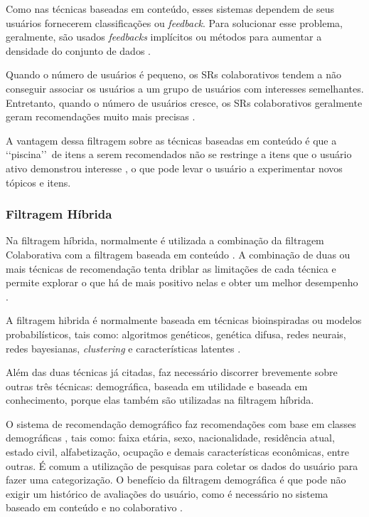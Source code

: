 Como nas técnicas baseadas em conteúdo, esses sistemas dependem de seus usuários fornecerem classificações ou \emph{feedback}. Para solucionar 
esse problema, geralmente, são usados \emph{feedbacks} implícitos ou métodos para aumentar 
a densidade do conjunto de dados \cite{paulson2003}.

Quando o número de usuários é pequeno, os SRs colaborativos tendem a não conseguir associar 
os usuários a um grupo de usuários com interesses semelhantes. Entretanto, quando o 
número de usuários cresce, os SRs colaborativos geralmente geram recomendações muito mais 
precisas \cite{mauricio}. 

A vantagem dessa filtragem sobre as técnicas baseadas em conteúdo é que a \lq\lq piscina\rq\rq\  de itens a serem recomendados 
não se restringe a itens que o usuário ativo demonstrou interesse \cite{paulson2003}, o que pode levar o usuário a experimentar novos tópicos e itens.


\subsubsection{Filtragem Híbrida}

Na filtragem híbrida, normalmente é utilizada a combinação da filtragem Colaborativa com a filtragem 
baseada em conteúdo \cite{bobadilla2013}. A combinação de duas ou mais técnicas de recomendação tenta driblar as limitações de cada 
técnica e permite explorar o que há de mais positivo nelas e obter um melhor desempenho \cite{burke2002}. 

A filtragem hibrida é normalmente baseada em técnicas bioinspiradas ou modelos probabilísticos, tais como: 
algoritmos genéticos, genética difusa, redes neurais, redes bayesianas, \emph{clustering} e características latentes  \cite{bobadilla2013}.

Além das duas técnicas já citadas, faz necessário discorrer brevemente sobre outras três técnicas: demográfica, baseada em utilidade e baseada em conhecimento, porque 
elas também são utilizadas na filtragem híbrida.


O sistema de recomendação demográfico faz recomendações com base em classes demográficas \cite{burke2002}, tais 
como: faixa etária, sexo, nacionalidade, residência atual, estado civil, 
alfabetização, ocupação e demais características econômicas, entre outras. É comum a utilização de pesquisas para 
coletar os  dados do usuário para fazer uma categorização. O benefício da filtragem demográfica é que
pode não exigir um histórico de avaliações do usuário, como é necessário no sistema baseado em conteúdo e no colaborativo \cite{burke2002}.

